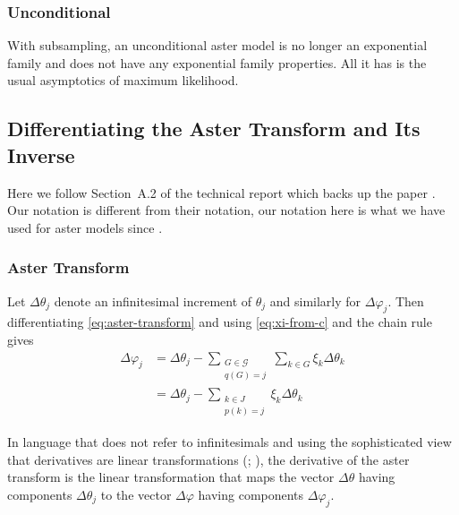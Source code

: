 \subsubsection{Unconditional}

With subsampling, an unconditional aster model is no longer an exponential
family and does not have any exponential family properties.  All it has
is the usual asymptotics of maximum likelihood.

\subsection{Differentiating the Aster Transform and Its Inverse}
\label{sec:aster-transform-deriv}

Here we follow Section~A.2 of the technical report \citet{aster1-tr} which
backs up the paper \citet{aster1}.  Our notation is different from their
notation, our notation here is what we have used for aster models since
\citet{aster-philosophical}.

\subsubsection{Aster Transform}

Let $\Delta \theta_j$ denote an infinitesimal increment of $\theta_j$
and similarly for $\Delta \varphi_j$.  Then
differentiating \eqref{eq:aster-transform} and using \eqref{eq:xi-from-c} and
the chain rule gives
\begin{equation} \label{eq:aster-transform-deriv}
\begin{split}
   \Delta \varphi_j
   & =
   \Delta \theta_j
   -
   \sum_{\substack{G \in \mathcal{G} \\ q(G) = j}} \sum_{k \in G}
   \xi_k \Delta \theta_k
   \\
   & =
   \Delta \theta_j
   -
   \sum_{\substack{k \in J \\ p(k) = j}}
   \xi_k \Delta \theta_k
\end{split}
\end{equation}

In language that does not refer to infinitesimals and using the
sophisticated view that derivatives are linear transformations
(\citealp[Definition~8.9]{browder}; \citealp[p.~334]{lang}),
 the derivative of the
aster transform is the linear transformation that maps
the vector $\Delta \theta$ having components $\Delta \theta_j$ to
the vector $\Delta \varphi$ having components $\Delta \varphi_j$.

